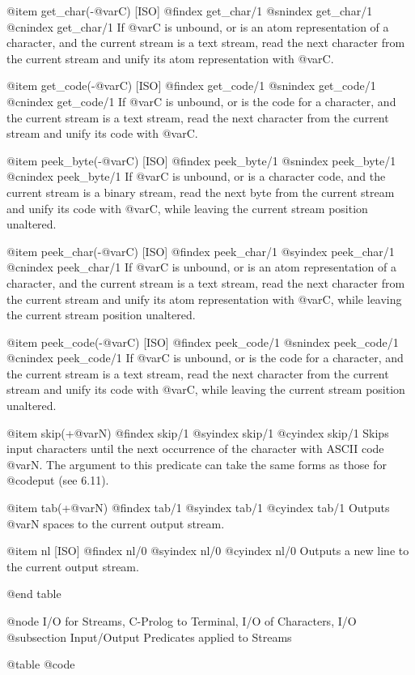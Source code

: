 {{{{{@item get_char(-@var{C}) [ISO]
@findex get_char/1
@snindex get_char/1
@cnindex get_char/1
If @var{C} is unbound, or is an atom representation of a character, and
the current stream is a text stream, read the next character from the
current stream and unify its atom representation with @var{C}.

@item get_code(-@var{C}) [ISO]
@findex get_code/1
@snindex get_code/1
@cnindex get_code/1
If @var{C} is unbound, or is the code for a character, and
the current stream is a text stream, read the next character from the
current stream and unify its code with @var{C}.

@item peek_byte(-@var{C}) [ISO]
@findex peek_byte/1
@snindex peek_byte/1
@cnindex peek_byte/1
If @var{C} is unbound, or is a character code, and the current stream is a
binary stream, read the next byte from the current stream and unify its
code with @var{C}, while leaving the current stream position unaltered.

@item peek_char(-@var{C}) [ISO]
@findex peek_char/1
@syindex peek_char/1
@cnindex peek_char/1
If @var{C} is unbound, or is an atom representation of a character, and
the current stream is a text stream, read the next character from the
current stream and unify its atom representation with @var{C}, while
leaving the current stream position unaltered.

@item peek_code(-@var{C}) [ISO]
@findex peek_code/1
@snindex peek_code/1
@cnindex peek_code/1
If @var{C} is unbound, or is the code for a character, and
the current stream is a text stream, read the next character from the
current stream and unify its code with @var{C}, while
leaving the current stream position unaltered.

@item skip(+@var{N})
@findex skip/1
@syindex skip/1
@cyindex skip/1
Skips input characters until the next occurrence of the character with
ASCII code @var{N}. The argument to this predicate can take the same forms
as those for @code{put} (see 6.11).

@item tab(+@var{N})
@findex tab/1
@syindex tab/1
@cyindex tab/1
Outputs @var{N} spaces to the current output stream.

@item nl [ISO]
@findex nl/0
@syindex nl/0
@cyindex nl/0
Outputs a new line to the current output stream.

@end table

@node I/O for Streams, C-Prolog to Terminal, I/O of Characters, I/O
@subsection Input/Output Predicates applied to Streams

@table @code

}}}}}
